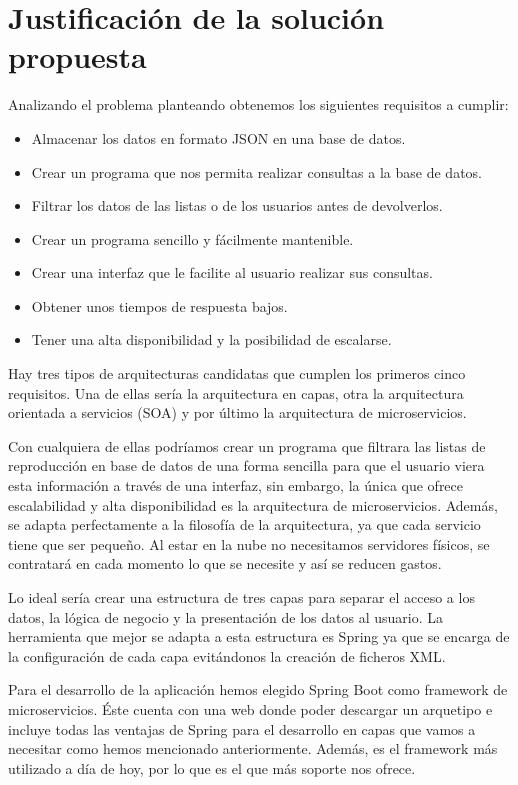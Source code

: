 \documentclass[12pt]{report} %
\begin{document}
\chapter{Justificación de la solución propuesta}

Analizando el problema planteando obtenemos los siguientes requisitos a cumplir:
\begin{itemize}
	\item Almacenar los datos en formato JSON en una base de datos.
	\item Crear un programa que nos permita realizar consultas a la base de datos.
	\item Filtrar los datos de las listas o de los usuarios antes de devolverlos.
	\item Crear un programa sencillo y fácilmente mantenible.
	\item Crear una interfaz que le facilite al usuario realizar sus consultas.
	\item Obtener unos tiempos de respuesta bajos.
	\item Tener una alta disponibilidad y la posibilidad de escalarse.
\end{itemize}

Hay tres tipos de arquitecturas candidatas que cumplen los primeros cinco requisitos. Una de ellas sería la arquitectura en capas, otra la arquitectura orientada a servicios (SOA) y por último la arquitectura de microservicios. 

Con cualquiera de ellas podríamos crear un programa que filtrara las listas de reproducción en base de datos de una forma sencilla para que el usuario viera esta información a través de una interfaz, sin embargo, la única que ofrece escalabilidad y alta disponibilidad es la arquitectura de microservicios. Además, se adapta perfectamente a la filosofía de la arquitectura, ya que cada servicio tiene que ser pequeño. Al estar en la nube no necesitamos servidores físicos, se contratará en cada momento lo que se necesite y así se reducen gastos.

Lo ideal sería crear una estructura de tres capas para separar el acceso a los datos, la lógica de negocio y la presentación de los datos al usuario. La herramienta que mejor se adapta a esta estructura es Spring ya que se encarga de la configuración de cada capa evitándonos la creación de ficheros XML.

Para el desarrollo de la aplicación hemos elegido Spring Boot como framework de microservicios. Éste cuenta con una web donde poder descargar un arquetipo e incluye todas las ventajas de Spring para el desarrollo en capas que vamos a necesitar como hemos mencionado anteriormente. Además, es el framework más utilizado a día de hoy, por lo que es el que más soporte nos ofrece.
\end{document}
